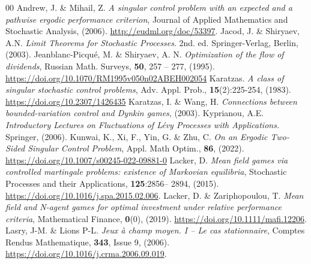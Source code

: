 \documentclass{article}
\begin{document}
\begin{thebibliography}{00}
Andrew, J. \& Mihail, Z. 
\textit{A singular control problem with an expected and a pathwise ergodic performance criterion},
Journal of Applied Mathematics and Stochastic Analysis, (2006).  \url{http://eudml.org/doc/53397}.
Jacod, J. \& Shiryaev, A.N.
\textit{Limit Theorems for Stochastic Processes}.
2nd. ed. Springer-Verlag, Berlin, (2003).
Jeanblanc-Picqué, M. \& Shiryaev, A. N. \textit{Optimization of the flow of dividends},
Russian Math. Surveys, \textbf{50}, 257 – 277, (1995).
\url{https://doi.org/10.1070/RM1995v050n02ABEH002054}
Karatzas. \textit{A class of singular stochastic control problems}, Adv. Appl. Prob., \textbf{15}(2):225-254, (1983).
\url{https://doi.org/10.2307/1426435}
Karatzas, I. \& Wang, H. \textit{Connections between bounded-variation control and Dynkin games}, (2003).
Kyprianou, A.E.
\textit{Introductory Lectures on Fluctuations of L\'evy Processes with Applications.} 
Springer, (2006).
Kunwai, K., Xi, F., Yin, G. \&  Zhu, C. \textit{On an Ergodic Two-Sided Singular Control Problem}, Appl. Math Optim., \textbf{86}, (2022). \url{https://doi.org/10.1007/s00245-022-09881-0}
Lacker, D. \textit{Mean field games via controlled martingale problems: existence
of Markovian equilibria}, Stochastic Processes and their Applications, \textbf{125}:2856–
2894, (2015). 
\url{https://doi.org/10.1016/j.spa.2015.02.006}.
Lacker, D. \& Zariphopoulou, T. \textit{Mean field and N-agent games for
optimal investment under relative performance criteria}, Mathematical Finance,
\textbf{0}(0), (2019).  \url{https://doi.org/10.1111/mafi.12206}.
Lasry, J-M. \& Lions P-L.
\textit{Jeux à champ moyen. I – Le cas stationnaire},
Comptes Rendus Mathematique,
 \textbf{343}, Issue 9, (2006).
\url{https://doi.org/10.1016/j.crma.2006.09.019}.


\end{thebibliography}
\end{document}

